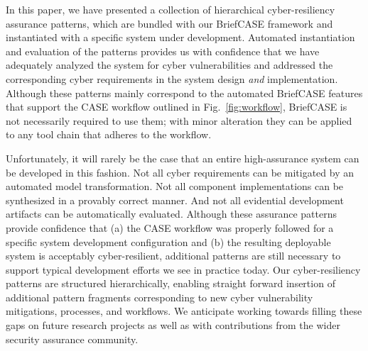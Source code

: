 
In this paper, we have presented a collection of hierarchical cyber-resiliency assurance patterns, which are bundled with our BriefCASE framework and instantiated with a specific system under development.  Automated instantiation and evaluation of the patterns provides us with confidence that we have adequately analyzed the system for cyber vulnerabilities and addressed the corresponding cyber requirements in the system design \textit{and} implementation.
Although these patterns mainly correspond to the automated BriefCASE features that support the CASE workflow outlined in Fig.~\ref{fig:workflow}, BriefCASE is not necessarily required to use them; with minor alteration they can be applied to any tool chain that adheres to the workflow.

Unfortunately, it will rarely be the case that an entire high-assurance system can be developed in this fashion.  Not all cyber requirements can be mitigated by an automated model transformation.  Not all component implementations can be synthesized in a provably correct manner.  And not all evidential development artifacts can be automatically evaluated.
%
Although these assurance patterns provide confidence that (a) the CASE workflow was properly followed for a specific system development configuration and (b) the resulting deployable system is acceptably cyber-resilient, additional patterns are still necessary to support typical development efforts we see in practice today.  
%
Our cyber-resiliency patterns are structured hierarchically, enabling straight forward insertion of additional pattern fragments corresponding to new cyber vulnerability mitigations, processes, and workflows. 
We anticipate working towards filling these gaps on future research projects as well as with contributions from the wider security assurance community.